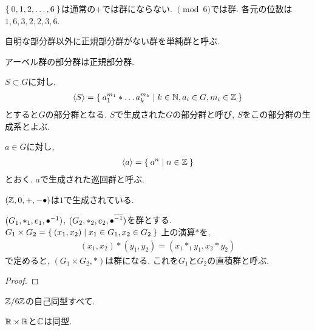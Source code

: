 \begin{example}
  $\Set{0,1,2,\ldots,6}$は通常の$+$では群にならない.
  $\pmod{6}$では群.
  各元の位数は$1,6,3,2,2,3,6$.
\end{example}

\begin{definition}
  自明な部分群以外に正規部分群がない群を単純群と呼ぶ.
\end{definition}
\begin{remark}
  アーベル群の部分群は正規部分群.
\end{remark}

\begin{definition}
  $S\subset G$に対し,
  \begin{align*}
    \Braket{S}=\Set{a_1^{m_1}\ast \dots a_k^{m_k}|k\in\mathbb{N}, a_i\in G, m_i\in \mathbb{Z}}
  \end{align*}
  とすると$G$の部分群となる.
  $S$で生成された$G$の部分群と呼び, $S$をこの部分群の生成系とよぶ.
\end{definition}
\begin{definition}
  $a\in G$に対し,
  \begin{align*}
    \Braket{a}=\Set{a^n|n\in\mathbb{Z}}
  \end{align*}
  とおく.
  $a$で生成された巡回群と呼ぶ.
\end{definition}

\begin{example}
$(\mathbb{Z},0,+,-{\bullet})$は$1$で生成されている.
\end{example}

\begin{prop}
  $(G_1,\ast_1,e_1,{\bullet}^{-1})$,
  $(G_2,\ast_2,e_2,{\bullet}^{\overline{-1}})$を群とする.
  $G_1\times G_2=\Set{(x_1,x_2)|x_1\in G_1,x_2\in G_2}$
  上の演算$\ast$を,
  \begin{align*}
    (x_1,x_2)\ast(y_1,y_2)=(x_1\ast_1y_1,x_2\ast y_2)
  \end{align*}
  で定めると, $(G_1\times G_2,\ast)$は群になる.
  これを$G_1$と$G_2$の直積群と呼ぶ.
\end{prop}
\begin{proof}\end{proof}

\begin{example}
  $\mathbb{Z}/6\mathbb{Z}$の自己同型すべて.
\end{example}
\begin{example}
$\mathbb{R}\times \mathbb{R}$と$\mathbb{C}$は同型.
\end{example}


